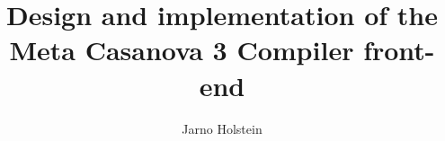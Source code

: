 \documentclass[xetex]{beamer}
\title{Design and implementation of the Meta Casanova 3 Compiler front-end }
\author{Jarno Holstein}
\begin{document}
    \frame{\titlepage}
    
%    
%    
%    
%    
\end{document}
